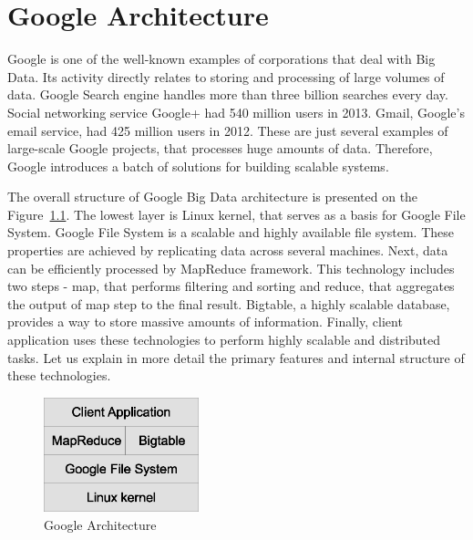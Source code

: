 \chapter{Google Architecture}
\label{chap:google_architecture}

Google is one of the well-known examples of corporations that deal with Big Data.
Its activity directly relates to storing and processing of large volumes of data.
Google Search engine handles more than three billion searches every day.
Social networking service Google+ had 540 million users in 2013.
Gmail, Google's email service, had 425 million users in 2012.
These are just several examples of large-scale Google projects, that processes huge amounts of data.
Therefore, Google introduces a batch of solutions for building scalable systems. 

The overall structure of Google Big Data architecture is presented on the
Figure~\ref{fig:google_architecture}.
The lowest layer is Linux kernel, that serves as a basis for Google File System.
Google File System is a scalable and highly available file system. 
These properties are achieved by replicating data across several machines.
Next, data can be efficiently processed by MapReduce framework.
This technology includes two steps - map, that performs filtering and sorting and reduce, that aggregates the output of map step to the final result.
Bigtable, a highly scalable database, provides a way to store massive amounts of information.
Finally, client application uses these technologies to perform highly scalable and distributed tasks.  
Let us explain in more detail the primary features and internal structure of these technologies.

\begin{figure}
  \centering
  \includegraphics [width=0.4\textwidth]{images/Google_architecture}
  \caption{Google Architecture}
  \label{fig:google_architecture}
\end{figure}

